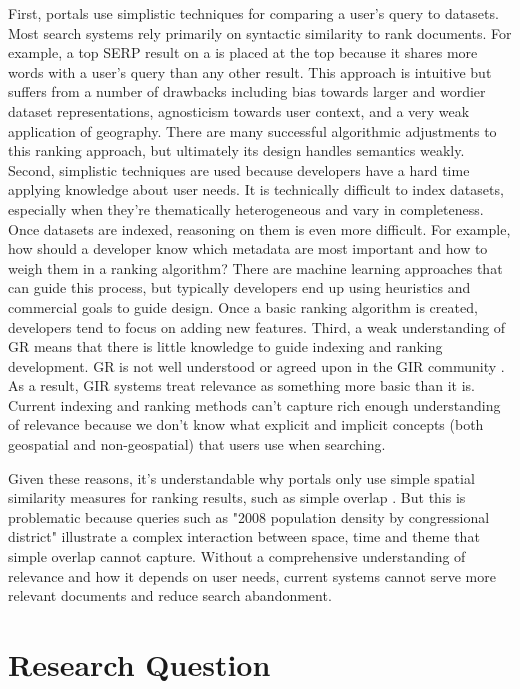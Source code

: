 First, portals use simplistic techniques for comparing a user's query to datasets. Most search systems rely primarily on syntactic similarity to rank documents. For example, a top SERP result on a is placed at the top because it shares more words with a user's query than any other result. This approach is intuitive but suffers from a number of drawbacks including bias towards larger and wordier dataset representations, agnosticism towards user context, and a very weak application of geography. There are many successful algorithmic adjustments to this ranking approach, but ultimately its design handles semantics weakly. Second, simplistic techniques are used because developers have a hard time applying knowledge about user needs. It is technically difficult to index datasets, especially when they're thematically heterogeneous and vary in completeness. Once datasets are indexed, reasoning on them is even more difficult. For example, how should a developer know which metadata are most important and how to weigh them in a ranking algorithm? There are machine learning approaches that can guide this process, but typically developers end up using heuristics and commercial goals to guide design. Once a basic ranking algorithm is created, developers tend to focus on adding new features. Third, a weak understanding of GR means that there is little knowledge to guide indexing and ranking development. GR is not well understood or agreed upon in the GIR community \cite{Purves2018}. As a result, GIR systems treat relevance as something more basic than it is. Current indexing and ranking methods can't capture rich enough understanding of relevance because we don't know what explicit and implicit concepts (both geospatial and non-geospatial) that users use when searching.

Given these reasons, it’s understandable why portals only use simple spatial similarity measures for ranking results, such as simple overlap . But this is problematic because queries such as "2008 population density by congressional district" illustrate a complex interaction between space, time and theme that simple overlap cannot capture. Without a comprehensive understanding of relevance and how it depends on user needs, current systems cannot serve more relevant documents and reduce search abandonment.

\section{Research Question}

